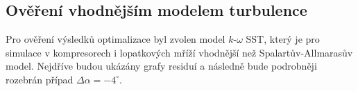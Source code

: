 %


\subsection{Ověření vhodnějším modelem turbulence}

Pro ověření výsledků optimalizace byl zvolen model $k\text{-}\omega$ SST, který je pro simulace v kompresorech i lopatkových mříží vhodnější než Spalartův-Allmarasův model. Nejdříve budou ukázány grafy residuí a následně bude podrobněji rozebrán případ $ \Delta \alpha = -4^\circ $.

